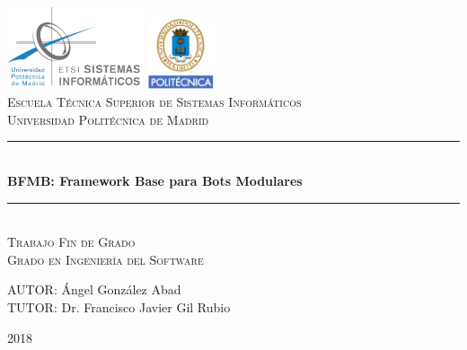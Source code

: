 \documentclass[spanish,12pt, a4paper, twoside]{paper}
\begin{document}
\begin{titlepage}

\newcommand{\HRule}{\rule{\linewidth}{0.5mm}} %

\center %
 
\includegraphics[width=4cm]{recursos/logoEtsisi.png}
  \hspace{8cm}
\includegraphics[width=2cm]{recursos/logo.png}
\\[1cm]

\textsc{\Large Escuela Técnica Superior de Sistemas Informáticos}\\[0.5cm]
\textsc{\large Universidad Politécnica de Madrid}
\\[3cm]


 \HRule \\[0.4cm]
{ \huge \bfseries BFMB: Framework Base para Bots Modulares}\\[0.4cm] %
\HRule \\[2.5cm]

\textsc{\LARGE Trabajo Fin de Grado}\\[0.5cm] 
\textsc{\Large Grado en Ingeniería del Software }\\[2.5cm]

\begin{flushright}
\large
AUTOR: Ángel González Abad\\
TUTOR: Dr. Francisco Javier Gil Rubio
\end{flushright}

\vspace{1.3cm}

{ {2018}}\\[3cm]

\vfill %

\end{titlepage}
\end{document}
